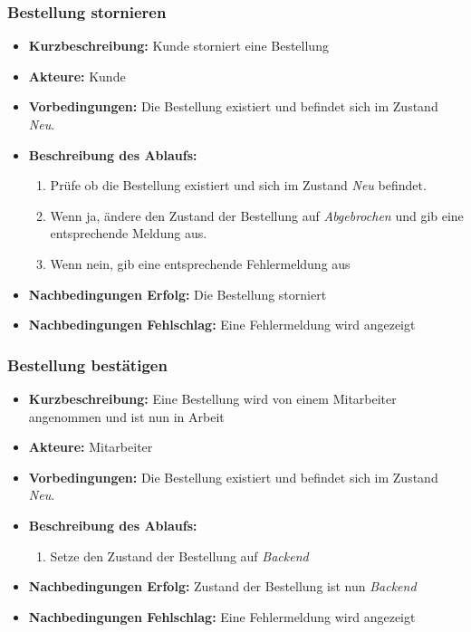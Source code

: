 \documentclass[a4paper]{report}
\begin{document}
\subsubsection*{Bestellung stornieren}
\begin{itemize}
    \item \textbf{Kurzbeschreibung:} Kunde storniert eine Bestellung
    \item \textbf{Akteure:} Kunde
    \item \textbf{Vorbedingungen:} Die Bestellung existiert und befindet sich im Zustand \textit{Neu}.
    \item \textbf{Beschreibung des Ablaufs:}
        \begin{enumerate}
            \item Prüfe ob die Bestellung existiert und sich im Zustand \textit{Neu} befindet.
            \item Wenn ja, ändere den Zustand der Bestellung auf \textit{Abgebrochen} und gib eine entsprechende Meldung aus. 
            \item Wenn nein, gib eine entsprechende Fehlermeldung aus
        \end{enumerate}
    \item \textbf{Nachbedingungen Erfolg:} Die Bestellung storniert
    \item \textbf{Nachbedingungen Fehlschlag:} Eine Fehlermeldung wird angezeigt
\end{itemize}
%
\subsubsection*{Bestellung bestätigen}
\begin{itemize}
    \item \textbf{Kurzbeschreibung:} Eine Bestellung wird von einem Mitarbeiter angenommen und ist nun in Arbeit
    \item \textbf{Akteure:} Mitarbeiter 
    \item \textbf{Vorbedingungen:} Die Bestellung existiert und befindet sich im Zustand \textit{Neu}.
    \item \textbf{Beschreibung des Ablaufs:}
        \begin{enumerate}
            \item Setze den Zustand der Bestellung auf \textit{Backend} 
        \end{enumerate}
    \item \textbf{Nachbedingungen Erfolg:} Zustand der Bestellung ist nun \textit{Backend}
    \item \textbf{Nachbedingungen Fehlschlag:} Eine Fehlermeldung wird angezeigt
\end{itemize}
%
\end{document}
